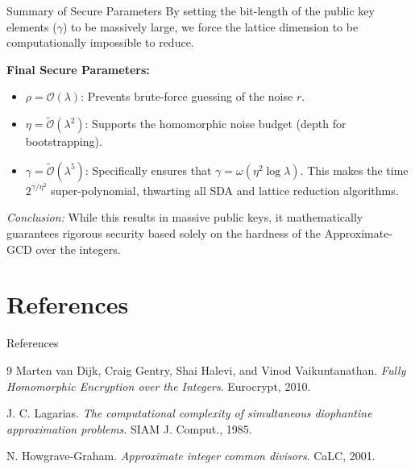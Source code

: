 \documentclass[10pt, aspectratio=169]{beamer}
\begin{document}
\begin{frame}{Summary of Secure Parameters}
    By setting the bit-length of the public key elements ($\gamma$) to be massively large, we force the lattice dimension to be computationally impossible to reduce. 
    \pause
    
    \vspace{0.3cm}
    \textbf{Final Secure Parameters:}
    \begin{itemize}
        \item $\rho = \mathcal{O}(\lambda)$: Prevents brute-force guessing of the noise $r$.
        \item $\eta = \tilde{\mathcal{O}}(\lambda^2)$: Supports the homomorphic noise budget (depth for bootstrapping).
        \item $\gamma = \tilde{\mathcal{O}}(\lambda^5)$: Specifically ensures that $\gamma = \omega(\eta^2 \log \lambda)$. This makes the time $2^{\gamma / \eta^2}$ super-polynomial, thwarting all SDA and lattice reduction algorithms.
    \end{itemize}
    \pause
    
    \vspace{0.3cm}
    \textit{Conclusion:} While this results in massive public keys, it mathematically guarantees rigorous security based solely on the hardness of the Approximate-GCD over the integers.
\end{frame}

\section{References}
\begin{frame}{References}
    \begin{thebibliography}{9}
        Marten van Dijk, Craig Gentry, Shai Halevi, and Vinod Vaikuntanathan.
        \textit{Fully Homomorphic Encryption over the Integers}. 
        Eurocrypt, 2010.
        
        J. C. Lagarias.
        \textit{The computational complexity of simultaneous diophantine approximation problems}. 
        SIAM J. Comput., 1985.
        
        N. Howgrave-Graham.
        \textit{Approximate integer common divisors}.
        CaLC, 2001.
    \end{thebibliography}
\end{frame}
\end{document}
